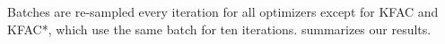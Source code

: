 Batches are re-sampled every iteration for all optimizers except for KFAC and KFAC*, which use the same batch for ten iterations.
 summarizes our results.


